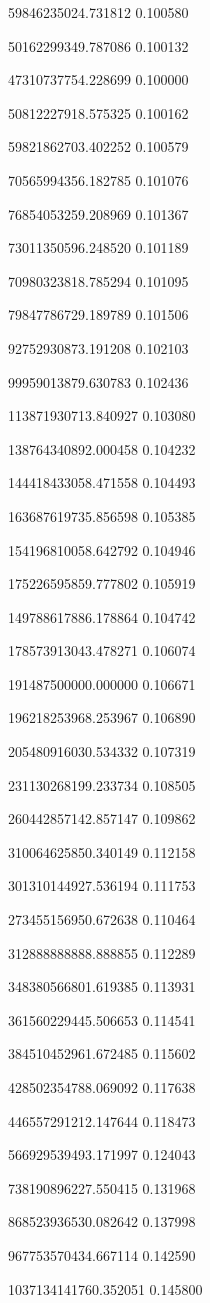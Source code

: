 \newcommand{\LogoGDPFirstYear}{1960}
\newcommand{\LogoGDPLastYear}{2025}
\newcommand{\LogoGDPMinimumHeight}{0.1}
\newcommand{\LogoGDPDeclare}[3]{%
    \expandafter\def\csname LogoGDPValue#1\endcsname{#2}%
    \expandafter\def\csname LogoGDPHeight#1\endcsname{#3}%
}
\newcommand{\LogoGDPValueForYear}[1]{\csname LogoGDPValue#1\endcsname}
\newcommand{\LogoGDPHeightForYear}[1]{\csname LogoGDPHeight#1\endcsname}

\LogoGDPDeclare{1960}{59846235024.731812}{0.100580}
\LogoGDPDeclare{1961}{50162299349.787086}{0.100132}
\LogoGDPDeclare{1962}{47310737754.228699}{0.100000}
\LogoGDPDeclare{1963}{50812227918.575325}{0.100162}
\LogoGDPDeclare{1964}{59821862703.402252}{0.100579}
\LogoGDPDeclare{1965}{70565994356.182785}{0.101076}
\LogoGDPDeclare{1966}{76854053259.208969}{0.101367}
\LogoGDPDeclare{1967}{73011350596.248520}{0.101189}
\LogoGDPDeclare{1968}{70980323818.785294}{0.101095}
\LogoGDPDeclare{1969}{79847786729.189789}{0.101506}
\LogoGDPDeclare{1970}{92752930873.191208}{0.102103}
\LogoGDPDeclare{1971}{99959013879.630783}{0.102436}
\LogoGDPDeclare{1972}{113871930713.840927}{0.103080}
\LogoGDPDeclare{1973}{138764340892.000458}{0.104232}
\LogoGDPDeclare{1974}{144418433058.471558}{0.104493}
\LogoGDPDeclare{1975}{163687619735.856598}{0.105385}
\LogoGDPDeclare{1976}{154196810058.642792}{0.104946}
\LogoGDPDeclare{1977}{175226595859.777802}{0.105919}
\LogoGDPDeclare{1978}{149788617886.178864}{0.104742}
\LogoGDPDeclare{1979}{178573913043.478271}{0.106074}
\LogoGDPDeclare{1980}{191487500000.000000}{0.106671}
\LogoGDPDeclare{1981}{196218253968.253967}{0.106890}
\LogoGDPDeclare{1982}{205480916030.534332}{0.107319}
\LogoGDPDeclare{1983}{231130268199.233734}{0.108505}
\LogoGDPDeclare{1984}{260442857142.857147}{0.109862}
\LogoGDPDeclare{1985}{310064625850.340149}{0.112158}
\LogoGDPDeclare{1986}{301310144927.536194}{0.111753}
\LogoGDPDeclare{1987}{273455156950.672638}{0.110464}
\LogoGDPDeclare{1988}{312888888888.888855}{0.112289}
\LogoGDPDeclare{1989}{348380566801.619385}{0.113931}
\LogoGDPDeclare{1990}{361560229445.506653}{0.114541}
\LogoGDPDeclare{1991}{384510452961.672485}{0.115602}
\LogoGDPDeclare{1992}{428502354788.069092}{0.117638}
\LogoGDPDeclare{1993}{446557291212.147644}{0.118473}
\LogoGDPDeclare{1994}{566929539493.171997}{0.124043}
\LogoGDPDeclare{1995}{738190896227.550415}{0.131968}
\LogoGDPDeclare{1996}{868523936530.082642}{0.137998}
\LogoGDPDeclare{1997}{967753570434.667114}{0.142590}
\LogoGDPDeclare{1998}{1037134141760.352051}{0.145800}
